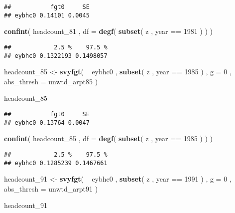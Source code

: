 \documentclass[]{book}
\newenvironment{Shaded}{\begin{snugshade}}{\end{snugshade}}
\newcommand{\KeywordTok}[1]{\textcolor[rgb]{0.13,0.29,0.53}{\textbf{{#1}}}}
\newcommand{\DataTypeTok}[1]{\textcolor[rgb]{0.13,0.29,0.53}{{#1}}}
\newcommand{\DecValTok}[1]{\textcolor[rgb]{0.00,0.00,0.81}{{#1}}}
\newcommand{\StringTok}[1]{\textcolor[rgb]{0.31,0.60,0.02}{{#1}}}
\newcommand{\NormalTok}[1]{{#1}}
\begin{document}
\begin{verbatim}
##           fgt0     SE
## eybhc0 0.14101 0.0045
\end{verbatim}

\begin{Shaded}
\begin{Highlighting}[]
\KeywordTok{confint}\NormalTok{( headcount_81 , }\DataTypeTok{df =} \KeywordTok{degf}\NormalTok{( }\KeywordTok{subset}\NormalTok{( z , year ==}\StringTok{ }\DecValTok{1981} \NormalTok{) ) )}
\end{Highlighting}
\end{Shaded}

\begin{verbatim}
##            2.5 %    97.5 %
## eybhc0 0.1322193 0.1498057
\end{verbatim}

\begin{Shaded}
\begin{Highlighting}[]
\NormalTok{headcount_85 <-}\StringTok{ }
\StringTok{    }\KeywordTok{svyfgt}\NormalTok{( }
        \NormalTok{~}\StringTok{ }\NormalTok{eybhc0 , }
        \KeywordTok{subset}\NormalTok{( z , year ==}\StringTok{ }\DecValTok{1985} \NormalTok{) , }
        \DataTypeTok{g =} \DecValTok{0} \NormalTok{, }
        \DataTypeTok{abs_thresh =} \NormalTok{unwtd_arpt85 }
    \NormalTok{)}
    
\NormalTok{headcount_85}
\end{Highlighting}
\end{Shaded}

\begin{verbatim}
##           fgt0     SE
## eybhc0 0.13764 0.0047
\end{verbatim}

\begin{Shaded}
\begin{Highlighting}[]
\KeywordTok{confint}\NormalTok{( headcount_85 , }\DataTypeTok{df =} \KeywordTok{degf}\NormalTok{( }\KeywordTok{subset}\NormalTok{( z , year ==}\StringTok{ }\DecValTok{1985} \NormalTok{) ) )}
\end{Highlighting}
\end{Shaded}

\begin{verbatim}
##            2.5 %    97.5 %
## eybhc0 0.1285239 0.1467661
\end{verbatim}

\begin{Shaded}
\begin{Highlighting}[]
\NormalTok{headcount_91 <-}\StringTok{ }
\StringTok{    }\KeywordTok{svyfgt}\NormalTok{( }
        \NormalTok{~}\StringTok{ }\NormalTok{eybhc0 , }
        \KeywordTok{subset}\NormalTok{( z , year ==}\StringTok{ }\DecValTok{1991} \NormalTok{) , }
        \DataTypeTok{g =} \DecValTok{0} \NormalTok{, }
        \DataTypeTok{abs_thresh =} \NormalTok{unwtd_arpt91 }
    \NormalTok{)}

\NormalTok{headcount_91}
\end{Highlighting}
\end{Shaded}
\end{document}

